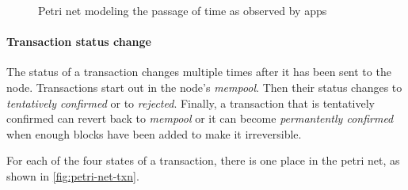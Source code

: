 \begin{figure}
  \centering
\caption{Petri net modeling the passage of time as observed by \glspl{app}}
\label{fig:petri-net-time}
\end{figure}

\paragraph{Transaction status change}

The status of a transaction changes multiple times after it has been sent to the node.
Transactions start out in the node's \emph{mempool}.
Then their status changes to \emph{tentatively confirmed} or to \emph{rejected}.
Finally, a transaction that is tentatively confirmed can revert back to \emph{mempool} or it can become \emph{permantently confirmed} when enough blocks have been added to make it irreversible.

For each of the four states of a transaction, there is one place in the petri net, as shown in \ref{fig:petri-net-txn}.

